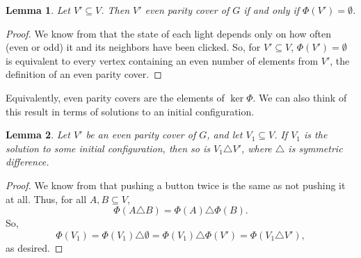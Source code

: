 \documentclass[a4paper]{article}
\newtheorem{lemma}{Lemma}
\begin{document}
	\begin{lemma}
		Let $V' \subseteq V$.
		Then $V'$ even parity cover of $G$ if and only if $\Phi(V') = \emptyset$.
	\end{lemma}
	\begin{proof}
		We know from \cite{anderson_feil} that the state of each light depends only on how often (even or odd) it and its neighbors have been clicked.
		So, for $V' \subseteq V$, $\Phi(V') = \emptyset$ is equivalent to every vertex containing an even number of elements from $V'$, the definition of an even parity cover.
	\end{proof}
	Equivalently, even parity covers are the elements of $\ker{\Phi}$.
	We can also think of this result in terms of solutions to an initial configuration.
	
	\begin{lemma}
		Let $V'$ be an even parity cover of $G$, and let $V_1 \subseteq V$.
		If $V_1$ is the solution to some initial configuration, then so is $V_1 \triangle V'$, where $\triangle$ is symmetric difference.
	\end{lemma}
	\begin{proof}
		We know from \cite{anderson_feil} that pushing a button twice is the same as not pushing it at all.
		Thus, for all $A, B \subseteq V$,
		\begin{equation*}
			\Phi(A \triangle B) = \Phi(A) \triangle \Phi(B).
		\end{equation*}
		So,
		\begin{equation*}
			\Phi(V_1) = \Phi(V_1) \triangle \emptyset = \Phi(V_1) \triangle \Phi(V') = \Phi(V_1 \triangle V'),
		\end{equation*}
		as desired.
	\end{proof}
	
		
\end{document}

